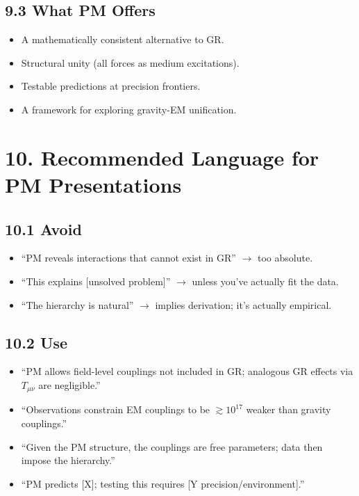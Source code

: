 \documentclass{article}
\begin{document}
\subsection*{9.3 What PM Offers}

\begin{itemize}
    \item A mathematically consistent alternative to GR.
    \item Structural unity (all forces as medium excitations).
    \item Testable predictions at precision frontiers.
    \item A framework for exploring gravity-EM unification.
\end{itemize}

\section*{10. Recommended Language for PM Presentations}

\subsection*{10.1 Avoid}

\begin{itemize}
    \item ``PM reveals interactions that cannot exist in GR'' $\rightarrow$ too absolute.
    \item ``This explains [unsolved problem]'' $\rightarrow$ unless you've actually fit the data.
    \item ``The hierarchy is natural'' $\rightarrow$ implies derivation; it's actually empirical.
\end{itemize}

\subsection*{10.2 Use}

\begin{itemize}
    \item ``PM allows field-level couplings not included in GR; analogous GR effects via $T_{\mu\nu}$ are negligible.''
    \item ``Observations constrain EM couplings to be $\gtrsim 10^{17}$ weaker than gravity couplings.''
    \item ``Given the PM structure, the couplings are free parameters; data then impose the hierarchy.''
    \item ``PM predicts [X]; testing this requires [Y precision/environment].''
\end{itemize}
\end{document}
